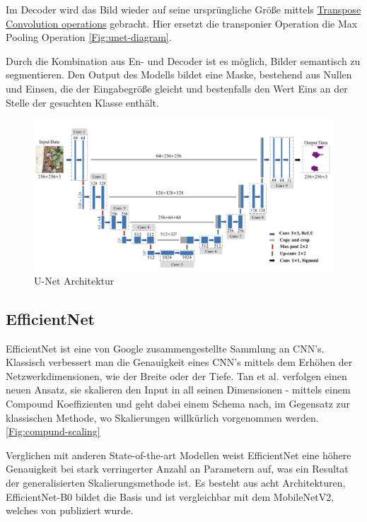 Im Decoder wird das Bild wieder auf seine ursprüngliche Größe mittels 
\href{https://en.wikipedia.org/wiki/Deconvolution}{Transpose Convolution operations}
gebracht. Hier ersetzt die transponier Operation die Max Pooling Operation \autoref{Fig:unet-diagram}. 

Durch die Kombination aus En- und Decoder ist es möglich, Bilder semantisch zu segmentieren. Den Output des Modells bildet eine Maske, bestehend aus Nullen und Einsen, die der Eingabegröße gleicht und bestenfalls den Wert Eins an der Stelle der gesuchten Klasse enthält.

\begin{figure}[H]
	\begin{center}
		\includegraphics[width=430pt]{bilder/u-net-architecture}
		\caption{U-Net Architektur \citet{Zhang:2020}}\label{Fig:unet-diagram}
	\end{center}
\end{figure}


\subsection{EfficientNet}
EfficientNet ist eine von Google zusammengestellte Sammlung an CNN's. Klassisch verbessert man die Genauigkeit eines CNN's mittels dem Erhöhen der Netzwerkdimensionen, wie der Breite oder der Tiefe. Tan et al. verfolgen einen neuen Ansatz, sie skalieren den Input in all seinen Dimensionen - mittels einem Compound Koeffizienten und geht dabei einem Schema nach, im Gegensatz zur klassischen Methode, wo Skalierungen willkürlich vorgenommen werden. \autoref{Fig:compund-scaling}

Verglichen mit anderen State-of-the-art Modellen weist EfficientNet eine höhere Genauigkeit bei stark verringerter Anzahl an Parametern auf, was ein Resultat der generalisierten Skalierungsmethode ist. Es besteht aus acht Architekturen, EfficientNet-B0 bildet die Basis und ist vergleichbar mit dem MobileNetV2, welches von \cite{MobileNetV2} publiziert wurde.



